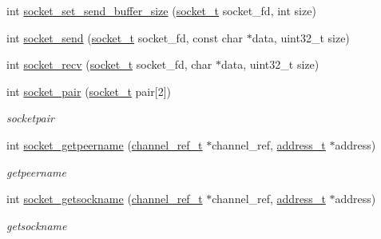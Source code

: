 \begin{DoxyCompactItemize}
\item 
int \hyperlink{a00063_a8489cd06398f759fff9660006dc8c10d_a8489cd06398f759fff9660006dc8c10d}{socket\+\_\+set\+\_\+send\+\_\+buffer\+\_\+size} (\hyperlink{a00044_a0d9e0afbf02fb6ed6c5b1415dce51b05_a0d9e0afbf02fb6ed6c5b1415dce51b05}{socket\+\_\+t} socket\+\_\+fd, int size)
\item 
int \hyperlink{a00063_a1acbefba637d7c0c3fd77355f84d4c22_a1acbefba637d7c0c3fd77355f84d4c22}{socket\+\_\+send} (\hyperlink{a00044_a0d9e0afbf02fb6ed6c5b1415dce51b05_a0d9e0afbf02fb6ed6c5b1415dce51b05}{socket\+\_\+t} socket\+\_\+fd, const char $\ast$data, uint32\+\_\+t size)
\item 
int \hyperlink{a00063_a8a4b901f1586de59d1d0a88d3326c934_a8a4b901f1586de59d1d0a88d3326c934}{socket\+\_\+recv} (\hyperlink{a00044_a0d9e0afbf02fb6ed6c5b1415dce51b05_a0d9e0afbf02fb6ed6c5b1415dce51b05}{socket\+\_\+t} socket\+\_\+fd, char $\ast$data, uint32\+\_\+t size)
\item 
int \hyperlink{a00063_a64d681185ca861b010c81db7479e9e08_a64d681185ca861b010c81db7479e9e08}{socket\+\_\+pair} (\hyperlink{a00044_a0d9e0afbf02fb6ed6c5b1415dce51b05_a0d9e0afbf02fb6ed6c5b1415dce51b05}{socket\+\_\+t} pair\mbox{[}2\mbox{]})
\begin{DoxyCompactList}\small\item\em socketpair \end{DoxyCompactList}\item 
int \hyperlink{a00063_af9dec30d9e18787252fecc0de537843f_af9dec30d9e18787252fecc0de537843f}{socket\+\_\+getpeername} (\hyperlink{a00044_a151271c9d188ef28d4d24bb81dcc1263_a151271c9d188ef28d4d24bb81dcc1263}{channel\+\_\+ref\+\_\+t} $\ast$channel\+\_\+ref, \hyperlink{a00044_a7a6e75b85c8b441f843bd40004a7d9d5_a7a6e75b85c8b441f843bd40004a7d9d5}{address\+\_\+t} $\ast$address)
\begin{DoxyCompactList}\small\item\em getpeername \end{DoxyCompactList}\item 
int \hyperlink{a00063_ad427473485df55e150741186f3ef2879_ad427473485df55e150741186f3ef2879}{socket\+\_\+getsockname} (\hyperlink{a00044_a151271c9d188ef28d4d24bb81dcc1263_a151271c9d188ef28d4d24bb81dcc1263}{channel\+\_\+ref\+\_\+t} $\ast$channel\+\_\+ref, \hyperlink{a00044_a7a6e75b85c8b441f843bd40004a7d9d5_a7a6e75b85c8b441f843bd40004a7d9d5}{address\+\_\+t} $\ast$address)
\begin{DoxyCompactList}\small\item\em getsockname \end{DoxyCompactList}\item 

\end{DoxyCompactItemize}
